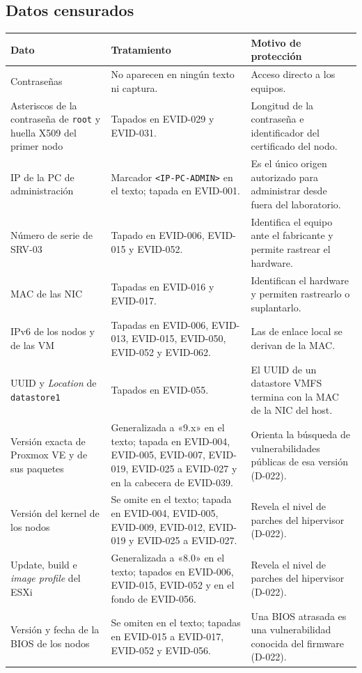 \documentclass[11pt,a4paper]{article}
\newcommand{\cab}{\rowcolor{light}}
\begin{document}
\subsection{Datos censurados}
{\small
\begin{longtable}{L{3.4cm} L{6.0cm} L{5.6cm}}
  \toprule
  \cab\textbf{Dato} & \textbf{Tratamiento} & \textbf{Motivo de protección}\\
  \midrule
  \endhead
  Contraseñas & No aparecen en ningún texto ni captura. & Acceso directo a los equipos.\\
  Asteriscos de la contraseña de \texttt{root} y huella X509 del primer nodo & Tapados en EVID-029 y EVID-031. & Longitud de la contraseña e identificador del certificado del nodo.\\
  IP de la PC de administración & Marcador \texttt{<IP-PC-ADMIN>} en el texto; tapada en EVID-001. & Es el único origen autorizado para administrar desde fuera del laboratorio.\\
  Número de serie de SRV-03 & Tapado en EVID-006, EVID-015 y EVID-052. & Identifica el equipo ante el fabricante y permite rastrear el hardware.\\
  MAC de las NIC & Tapadas en EVID-016 y EVID-017. & Identifican el hardware y permiten rastrearlo o suplantarlo.\\
  IPv6 de los nodos y de las VM & Tapadas en EVID-006, EVID-013, EVID-015, EVID-050, EVID-052 y EVID-062. & Las de enlace local se derivan de la MAC.\\
  UUID y \emph{Location} de \texttt{datastore1} & Tapados en EVID-055. & El UUID de un datastore VMFS termina con la MAC de la NIC del host.\\
  Versión exacta de Proxmox VE y de sus paquetes & Generalizada a «9.x» en el texto; tapada en EVID-004, EVID-005, EVID-007, EVID-019, EVID-025 a EVID-027 y en la cabecera de EVID-039. & Orienta la búsqueda de vulnerabilidades públicas de esa versión (D-022).\\
  Versión del kernel de los nodos & Se omite en el texto; tapada en EVID-004, EVID-005, EVID-009, EVID-012, EVID-019 y EVID-025 a EVID-027. & Revela el nivel de parches del hipervisor (D-022).\\
  Update, build e \emph{image profile} del ESXi & Generalizada a «8.0» en el texto; tapados en EVID-006, EVID-015, EVID-052 y en el fondo de EVID-056. & Revela el nivel de parches del hipervisor (D-022).\\
  Versión y fecha de la BIOS de los nodos & Se omiten en el texto; tapadas en EVID-015 a EVID-017, EVID-052 y EVID-056. & Una BIOS atrasada es una vulnerabilidad conocida del firmware (D-022).\\

\end{longtable}}
\end{document}
